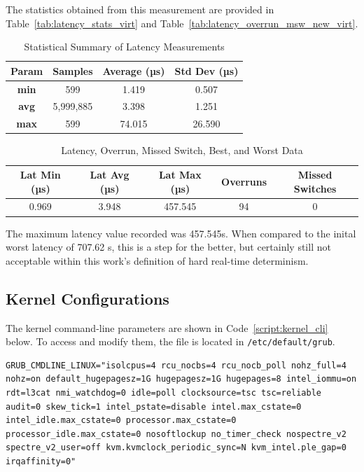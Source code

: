 \documentclass[MMR,Master,english]{twbook}
\begin{document}
\noindent The statistics obtained from this measurement are provided in Table~\ref{tab:latency_stats_virt} and Table~\ref{tab:latency_overrun_msw_new_virt}. 

\begin{table}[H]
	\centering
	\begin{tabular}{|c|c|c|c|}
	\hline
	\textbf{Param} & \textbf{Samples} & \textbf{Average (µs)} & \textbf{Std Dev (µs)} \\ \hline
	\textbf{min} & 599 & 1.419 & 0.507 \\ \hline
	\textbf{avg} & 5,999,885 & 3.398 & 1.251 \\ \hline
	\textbf{max} & 599 & 74.015 & 26.590 \\ \hline
	\end{tabular}
	\caption{Statistical Summary of Latency Measurements}
	\label{tab:latency_stats_virt_bios}
	\end{table}
	
	\begin{table}[H]
	\centering
	\begin{tabular}{|c|c|c|c|c|}
	\hline
	\textbf{Lat Min (µs)} & \textbf{Lat Avg (µs)} & \textbf{Lat Max (µs)} & \textbf{Overruns} & \textbf{Missed Switches}  \\ \hline
	0.969 & 3.948 & 457.545 & 94 & 0 \\ \hline
	\end{tabular}
	\caption{Latency, Overrun, Missed Switch, Best, and Worst Data}
	\label{tab:latency_overrun_msw_new_virt_bios}
	\end{table}

\noindent The maximum latency value recorded was 457.545\textmu s. When compared to the inital worst latency of 707.62 \textmu s, this is a step for the better, but certainly still not acceptable within this work's definition of hard real-time determinism. 

\subsection{Kernel Configurations}\label{subsec:kernel_configurations}
The kernel command-line parameters are shown in Code~\ref{script:kernel_cli} below. To access and modify them, the file is located in \texttt{/etc/default/grub}.

\vspace{2em}
\begin{lstlisting}[name={Kernel Configuration},label={script:kernel_cli}]
		GRUB_CMDLINE_LINUX="isolcpus=4 rcu_nocbs=4 rcu_nocb_poll nohz_full=4 nohz=on default_hugepagesz=1G hugepagesz=1G hugepages=8 intel_iommu=on rdt=l3cat nmi_watchdog=0 idle=poll clocksource=tsc tsc=reliable audit=0 skew_tick=1 intel_pstate=disable intel.max_cstate=0 intel_idle.max_cstate=0 processor.max_cstate=0 processor_idle.max_cstate=0 nosoftlockup no_timer_check nospectre_v2 spectre_v2_user=off kvm.kvmclock_periodic_sync=N kvm_intel.ple_gap=0 irqaffinity=0"
\end{lstlisting}
\end{document}
